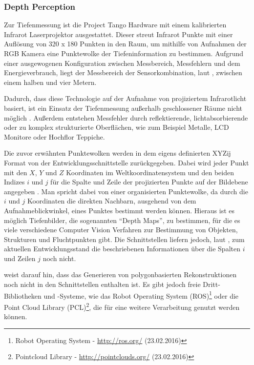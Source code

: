 \subsubsection{Depth Perception}

Zur Tiefenmessung ist die Project Tango Hardware mit einem kalibrierten Infrarot Laserprojektor ausgestattet. Dieser streut Infrarot Punkte mit einer Auflösung von 320 x 180 Punkten in den Raum, um mithilfe von Aufnahmen der RGB Kamera eine Punktewolke der Tiefeninformation zu bestimmen. Aufgrund einer ausgewogenen Konfiguration zwischen Messbereich, Messfehlern und dem Energieverbrauch, liegt der Messbereich der Sensorkombination, laut \citet{GoogleDevelopersConcepts:online}, zwischen einem halben und vier Metern. 

Dadurch, dass diese Technologie auf der Aufnahme von projiziertem Infrarotlicht basiert, ist ein Einsatz der Tiefenmessung außerhalb geschlossener Räume nicht möglich \citep{GoogleDevelopersConcepts:online}. Außerdem entstehen Messfehler durch reflektierende, lichtabsorbierende oder zu komplex strukturierte Oberflächen, wie zum Beispiel Metalle, LCD Monitore oder Hochflor Teppiche. 

Die zuvor erwähnten Punktewolken werden in dem eigens definierten XYZij Format von der Entwicklungsschnittstelle zurückgegeben. Dabei wird jeder Punkt mit den \(X\), \(Y\) und \(Z\) Koordinaten im Weltkoordinatensystem und den beiden Indizes \(i \) und \(j \) für die Spalte und Zeile der projizierten Punkte auf der Bildebene angegeben \citep{GoogleDevelopersConcepts:online}. Man spricht dabei von einer organisierten Punktewolke, da durch die \(i\) und \(j\) Koordinaten die direkten Nachbarn, ausgehend von dem Aufnahmeblickwinkel, eines Punktes bestimmt werden können. Hieraus ist es möglich Tiefenbilder, die sogenannten \enquote{Depth Maps}, zu bestimmen, für die es viele verschiedene Computer Vision Verfahren zur Bestimmung von Objekten, Strukturen und Fluchtpunkten gibt. Die Schnittstellen liefern jedoch, laut \citet{GoogleDevelopersKnownIssues:online}, zum aktuellen Entwicklungsstand die beschriebenen Informationen über die Spalten \(i\) und Zeilen \(j\) noch nicht.

\citet{GoogleDevelopersConcepts:online} weist darauf hin, dass das Generieren von polygonbasierten Rekonstruktionen noch nicht in den Schnittstellen enthalten ist. Es gibt jedoch freie Dritt-Bibliotheken und -Systeme, wie das Robot Operating System (ROS)\footnote{Robot Operating System - \url{http://ros.org/} (23.02.2016)} oder die Point Cloud Library (PCL)\footnote{Pointcloud Library - \url{http://pointclouds.org/} (23.02.2016)}, die für eine weitere Verarbeitung genutzt werden können.

